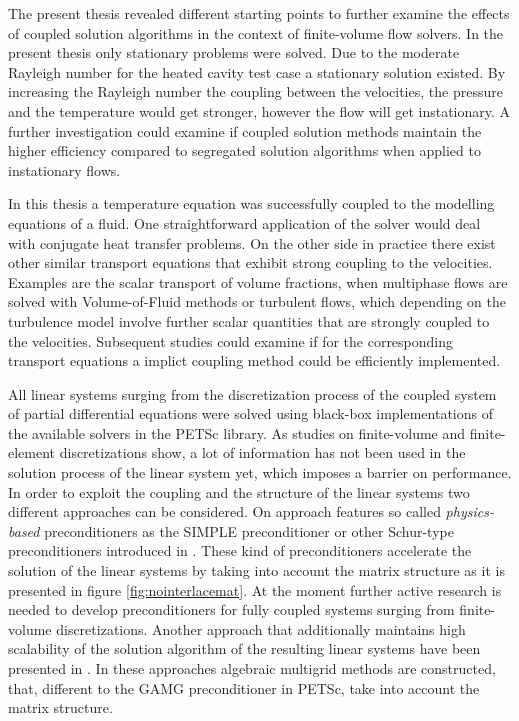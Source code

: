 The present thesis revealed different starting points to further examine the effects of coupled solution algorithms in the context of finite-volume flow solvers. In the present thesis only stationary problems were solved. Due to the moderate Rayleigh number for the heated cavity test case a stationary solution existed. By increasing the Rayleigh number the coupling between the velocities, the pressure and the temperature would get stronger, however the flow will get instationary. A further investigation could examine if coupled solution methods maintain the higher efficiency compared to segregated solution algorithms when applied to instationary flows.

In this thesis a temperature equation was successfully coupled to the modelling equations of a fluid. One straightforward application of the solver would deal with conjugate heat transfer problems. On the other side in practice there exist other similar transport equations that exhibit strong coupling to the velocities. Examples are the scalar transport of volume fractions, when multiphase flows are solved with Volume-of-Fluid methods or turbulent flows, which depending on the turbulence model involve further scalar quantities that are strongly coupled to the velocities. Subsequent studies could examine if for the corresponding transport equations a implict coupling method could be efficiently implemented.

All linear systems surging from the discretization process of the coupled system of partial differential equations were solved using black-box implementations of the available solvers in the PETSc library. As studies on finite-volume \cite{klaij13,darwish09,mangani14} and finite-element \cite{brown12,elman03,elman08,silvester01,turek02,mcinnes14} discretizations show, a lot of information has not been used in the solution process of the linear system yet, which imposes a barrier on performance. In order to exploit the coupling and the structure of the linear systems two different approaches can be considered. On approach features so called \emph{physics-based} preconditioners as the SIMPLE preconditioner or other Schur-type preconditioners introduced in \cite{klaij13,elman08}. These kind of preconditioners accelerate the solution of the linear systems by taking into account the matrix structure as it is presented in figure \ref{fig:nointerlacemat}. At the moment further active research is needed to develop preconditioners for fully coupled systems surging from finite-volume discretizations. Another approach that additionally maintains high scalability of the solution algorithm of the resulting linear systems have been presented in \cite{darwish09,mangani14}. In these approaches algebraic multigrid methods are constructed, that, different to the GAMG preconditioner in PETSc, take into account the matrix structure.

